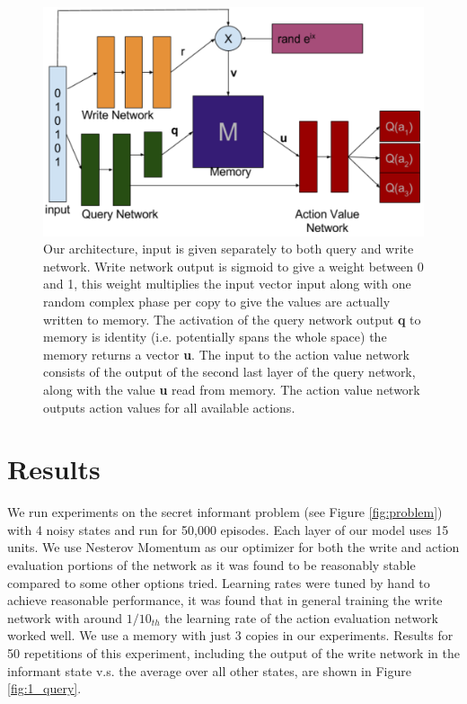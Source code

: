 \documentclass{article}
\begin{document}
\begin{figure}[!ht]
\includegraphics[width=1\textwidth]{images/architecture.png}
\caption{Our architecture, input is given separately to both query and write network. Write network output is sigmoid to give a weight between 0 and 1, this weight multiplies the input vector input along with one random complex phase per copy to give the values are actually written to memory. The activation of the query network output \textbf{q} to memory is identity (i.e. potentially spans the whole space) the memory returns a vector \textbf{u}. The input to the action value network consists of the output of the second last layer of the query network, along with the value \textbf{u} read from memory. The action value network outputs action values for all available actions. }
\label{fig:arch}
\end{figure}

\section*{Results}
We run experiments on the secret informant problem (see Figure \ref{fig:problem}) with 4 noisy states and run for 50,000 episodes. Each layer of our model uses 15 units. We use Nesterov Momentum as our optimizer for both the write and action evaluation portions of the network as it was found to be reasonably stable compared to some other options tried. Learning rates were tuned by hand to achieve reasonable performance, it was found that in general training the write network with around $1/10_{th}$ the learning rate of the action evaluation network worked well. We use a memory with just 3 copies in our experiments. Results for 50 repetitions of this experiment, including the output of the write network in the informant state v.s. the average over all other states, are shown in Figure \ref{fig:1_query}.
\end{document}
